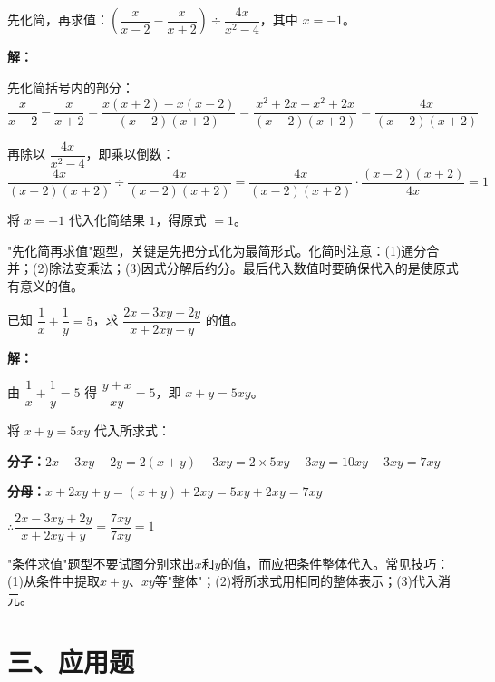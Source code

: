\documentclass[12pt, a4paper]{ctexart}
\begin{document}
\begin{examplebox}[【例题6】分式化简求值]
先化简，再求值：$\left(\dfrac{x}{x-2} - \dfrac{x}{x+2}\right) \div \dfrac{4x}{x^2 - 4}$，其中 $x = -1$。

\bigskip
\textbf{解：}

先化简括号内的部分：
\[
\frac{x}{x-2} - \frac{x}{x+2} = \frac{x(x+2) - x(x-2)}{(x-2)(x+2)} = \frac{x^2+2x-x^2+2x}{(x-2)(x+2)} = \frac{4x}{(x-2)(x+2)}
\]

再除以 $\dfrac{4x}{x^2-4}$，即乘以倒数：
\[
\frac{4x}{(x-2)(x+2)} \div \frac{4x}{(x-2)(x+2)} = \frac{4x}{(x-2)(x+2)} \cdot \frac{(x-2)(x+2)}{4x} = 1
\]

将 $x = -1$ 代入化简结果 $1$，得原式 $= 1$。
\end{examplebox}

\begin{tipbox}[方法总结]
"先化简再求值"题型，关键是先把分式化为最简形式。化简时注意：(1)通分合并；(2)除法变乘法；(3)因式分解后约分。最后代入数值时要确保代入的是使原式有意义的值。
\end{tipbox}

\begin{examplebox}
已知 $\dfrac{1}{x} + \dfrac{1}{y} = 5$，求 $\dfrac{2x - 3xy + 2y}{x + 2xy + y}$ 的值。

\bigskip
\textbf{解：}

由 $\dfrac{1}{x} + \dfrac{1}{y} = 5$ 得 $\dfrac{y + x}{xy} = 5$，即 $x + y = 5xy$。

将 $x + y = 5xy$ 代入所求式：

\textbf{分子：}$2x - 3xy + 2y = 2(x+y) - 3xy = 2 \times 5xy - 3xy = 10xy - 3xy = 7xy$

\textbf{分母：}$x + 2xy + y = (x+y) + 2xy = 5xy + 2xy = 7xy$

$\therefore \dfrac{2x - 3xy + 2y}{x + 2xy + y} = \dfrac{7xy}{7xy} = 1$
\end{examplebox}

\begin{tipbox}[方法总结]
"条件求值"题型不要试图分别求出$x$和$y$的值，而应把条件整体代入。常见技巧：(1)从条件中提取$x+y$、$xy$等"整体"；(2)将所求式用相同的整体表示；(3)代入消元。
\end{tipbox}

\section*{\textcolor{apppurple}{三、应用题}}
\end{document}
